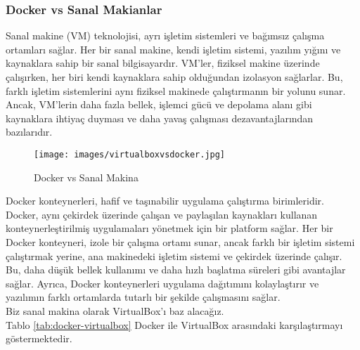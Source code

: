 \subsubsection{Docker vs Sanal Makianlar}
Sanal makine (VM) teknolojisi, ayrı işletim sistemleri ve bağımsız çalışma ortamları sağlar. Her bir sanal makine, kendi işletim sistemi, yazılım yığını ve kaynaklara sahip bir sanal bilgisayardır. VM'ler, fiziksel makine üzerinde çalışırken, her biri kendi kaynaklara sahip olduğundan izolasyon sağlarlar. Bu, farklı işletim sistemlerini aynı fiziksel makinede çalıştırmanın bir yolunu sunar. Ancak, VM'lerin daha fazla bellek, işlemci gücü ve depolama alanı gibi kaynaklara ihtiyaç duyması ve daha yavaş çalışması dezavantajlarından bazılarıdır.\\
\begin{figure}[]
    \centering
    \texttt{[image: images/virtualboxvsdocker.jpg]}
    \caption{Docker vs Sanal Makina}
    \label{fig:resim_etiketi}
  \end{figure}
Docker konteynerleri, hafif ve taşınabilir uygulama çalıştırma birimleridir. Docker, aynı çekirdek üzerinde çalışan ve paylaşılan kaynakları kullanan konteynerleştirilmiş uygulamaları yönetmek için bir platform sağlar. Her bir Docker konteyneri, izole bir çalışma ortamı sunar, ancak farklı bir işletim sistemi çalıştırmak yerine, ana makinedeki işletim sistemi ve çekirdek üzerinde çalışır. Bu, daha düşük bellek kullanımı ve daha hızlı başlatma süreleri gibi avantajlar sağlar. Ayrıca, Docker konteynerleri uygulama dağıtımını kolaylaştırır ve yazılımın farklı ortamlarda tutarlı bir şekilde çalışmasını sağlar.\\
Biz sanal makina olarak VirtualBox'ı baz alacağız.\\
Tablo \ref{tab:docker-virtualbox} Docker ile VirtualBox arasındaki karşılaştırmayı göstermektedir.\\
